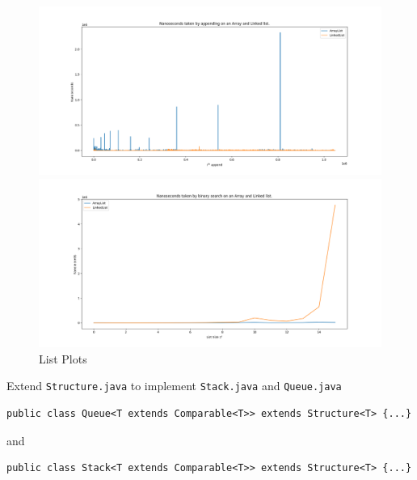 \documentclass{homework}
\begin{document}
\begin{figure}[htbp] %
  \begin{minipage}[t]{0.45\textwidth} %
    \centering
    \includegraphics[width=\linewidth]{./media/List_append.png} %
  \end{minipage}
  \hfil
  \begin{minipage}[t]{0.45\textwidth} %
    \centering
    \includegraphics[width=\linewidth]{./media/List_search.png} %
  \end{minipage}
  \caption{List Plots}
\end{figure}

\question Extend \texttt{Structure.java} to implement \texttt{Stack.java}
and \texttt{Queue.java} \ie
\begin{verbatim}
public class Queue<T extends Comparable<T>> extends Structure<T> {...}
\end{verbatim}
and
\begin{verbatim}
public class Stack<T extends Comparable<T>> extends Structure<T> {...}
\end{verbatim}
\end{document}
